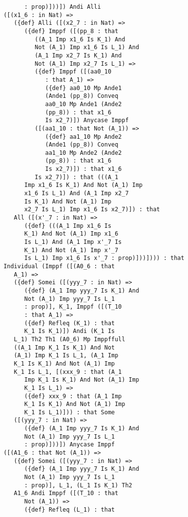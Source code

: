 \documentclass{article}
\begin{document}
\begin{verbatim}
             : prop)]))]) Andi Alli 
       ([(x1_6 : in Nat) => 
          ({def} Alli ([(x2_7 : in Nat) => 
             ({def} Imppf ([(pp_8 : that 
                ((A_1 Imp x1_6 Is K_1) And 
                Not (A_1) Imp x1_6 Is L_1) And 
                (A_1 Imp x2_7 Is K_1) And 
                Not (A_1) Imp x2_7 Is L_1) => 
                ({def} Imppf ([(aa0_10 
                   : that A_1) => 
                   ({def} aa0_10 Mp Ande1 
                   (Ande1 (pp_8)) Conveq 
                   aa0_10 Mp Ande1 (Ande2 
                   (pp_8)) : that x1_6 
                   Is x2_7)]) Anycase Imppf 
                ([(aa1_10 : that Not (A_1)) => 
                   ({def} aa1_10 Mp Ande2 
                   (Ande1 (pp_8)) Conveq 
                   aa1_10 Mp Ande2 (Ande2 
                   (pp_8)) : that x1_6 
                   Is x2_7)]) : that x1_6 
                Is x2_7)]) : that (((A_1 
             Imp x1_6 Is K_1) And Not (A_1) Imp 
             x1_6 Is L_1) And (A_1 Imp x2_7 
             Is K_1) And Not (A_1) Imp 
             x2_7 Is L_1) Imp x1_6 Is x2_7)]) : that 
          All ([(x'_7 : in Nat) => 
             ({def} (((A_1 Imp x1_6 Is 
             K_1) And Not (A_1) Imp x1_6 
             Is L_1) And (A_1 Imp x'_7 Is 
             K_1) And Not (A_1) Imp x'_7 
             Is L_1) Imp x1_6 Is x'_7 : prop)]))]))) : that 
       Individual (Imppf ([(A0_6 : that 
          A_1) => 
          ({def} Somei ([(yyy_7 : in Nat) => 
             ({def} (A_1 Imp yyy_7 Is K_1) And 
             Not (A_1) Imp yyy_7 Is L_1 
             : prop)], K_1, Imppf ([(T_10 
             : that A_1) => 
             ({def} Refleq (K_1) : that 
             K_1 Is K_1)]) Andi (K_1 Is 
          L_1) Th2 Th1 (A0_6) Mp Imppffull 
          ((A_1 Imp K_1 Is K_1) And Not 
          (A_1) Imp K_1 Is L_1, (A_1 Imp 
          K_1 Is K_1) And Not (A_1) Imp 
          K_1 Is L_1, [(xxx_9 : that (A_1 
             Imp K_1 Is K_1) And Not (A_1) Imp 
             K_1 Is L_1) => 
             ({def} xxx_9 : that (A_1 Imp 
             K_1 Is K_1) And Not (A_1) Imp 
             K_1 Is L_1)])) : that Some 
          ([(yyy_7 : in Nat) => 
             ({def} (A_1 Imp yyy_7 Is K_1) And 
             Not (A_1) Imp yyy_7 Is L_1 
             : prop)]))]) Anycase Imppf 
       ([(A1_6 : that Not (A_1)) => 
          ({def} Somei ([(yyy_7 : in Nat) => 
             ({def} (A_1 Imp yyy_7 Is K_1) And 
             Not (A_1) Imp yyy_7 Is L_1 
             : prop)], L_1, (L_1 Is K_1) Th2 
          A1_6 Andi Imppf ([(T_10 : that 
             Not (A_1)) => 
             ({def} Refleq (L_1) : that 

\end{verbatim}
\end{document}
